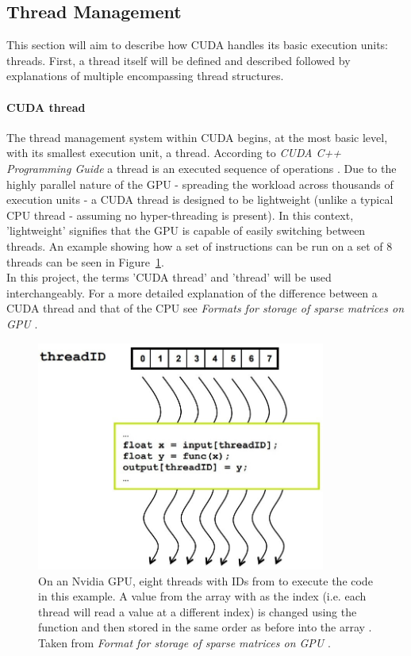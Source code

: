 \subsection{Thread Management}\label{Subsection:thread-management}
This section will aim to describe how CUDA handles its basic execution units: threads. First, a thread itself will be defined and described followed by explanations of multiple encompassing thread structures.

\paragraph{CUDA thread}
The thread management system within CUDA begins, at the most basic level, with its smallest execution unit, a thread. According to \emph{CUDA C++ Programming Guide} a thread is an executed sequence of operations \cite{NVIDIAMay2022}. Due to the highly parallel nature of the GPU - spreading the workload across thousands of execution units - a CUDA thread is designed to be lightweight (unlike a typical CPU thread - assuming no hyper-threading is present). In this context, 'lightweight' signifies that the GPU is capable of easily switching between threads. An example showing how a set of instructions can be run on a set of 8 threads can be seen in Figure~\ref{Figure:theory-CUDA-thread-parallelism}. \\
In this project, the terms 'CUDA thread' and 'thread' will be used interchangeably. For a more detailed explanation of the difference between a CUDA thread and that of the CPU see \emph{Formats for storage of sparse matrices on GPU} \cite{Cejka2020}.

\begin{figure}[ht!]
	\centering
	\includegraphics[width=9.5cm, keepaspectratio, clip]{images/ch1/CUDA_thread_parallelism.jpg}
	\caption{On an Nvidia GPU, eight threads with IDs from  to  execute the code in this example. A value from the array  with  as the index (i.e. each thread will read a value at a different index) is changed using the function  and then stored in the same order as before into the array . Taken from \emph{Format for storage of sparse matrices on GPU} \cite{Cejka2020, Ruetsch2008}.}
	\label{Figure:theory-CUDA-thread-parallelism}
\end{figure}

